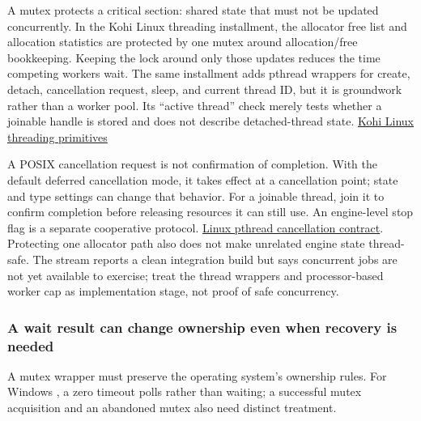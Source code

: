 A mutex protects a critical section: shared state that must not be updated concurrently. In the Kohi Linux threading installment, the allocator free list and allocation statistics are protected by one mutex around allocation/free bookkeeping. Keeping the lock around only those updates reduces the time competing workers wait. The same installment adds pthread wrappers for create, detach, cancellation request, sleep, and current thread ID, but it is groundwork rather than a worker pool. Its ``active thread'' check merely tests whether a joinable handle is stored and does not describe detached-thread state. \href{https://www.youtube.com/watch?v=NxtqrN6Jw-4}{Kohi Linux threading primitives}

A POSIX cancellation request is not confirmation of completion. With the default deferred cancellation mode, it takes effect at a cancellation point; state and type settings can change that behavior. For a joinable thread, join it to confirm completion before releasing resources it can still use. An engine-level stop flag is a separate cooperative protocol. \href{https://man7.org/linux/man-pages/man3/pthread_cancel.3.html}{Linux pthread cancellation contract}. Protecting one allocator path also does not make unrelated engine state thread-safe. The stream reports a clean integration build but says concurrent jobs are not yet available to exercise; treat the thread wrappers and processor-based worker cap as implementation stage, not proof of safe concurrency.

\subsubsection{A wait result can change ownership even when recovery is needed}\label{05-engine-i-ch013-a-wait-result-can-change-ownership-even-when-recovery-is-needed}

\hypertarget{05-engine-i-ch013-a-wait-result-can-change-ownership-even-when-recovery-is-needed}{}

A mutex wrapper must preserve the operating system's ownership rules. For Windows , a zero timeout polls rather than waiting; a successful mutex acquisition and an abandoned mutex also need distinct treatment.

